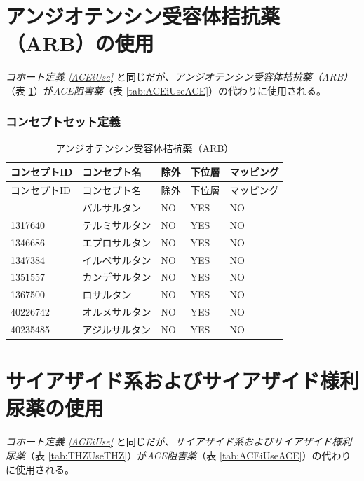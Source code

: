 \documentclass[
  11pt]{book}
\theoremstyle{definition}
\theoremstyle{definition}
\theoremstyle{definition}
\theoremstyle{definition}
\theoremstyle{remark}
\begin{document}
\section{アンジオテンシン受容体拮抗薬（ARB）の使用}\label{ARBUse}

\emph{コホート定義 \ref{ACEiUse}} と同じだが、\emph{アンジオテンシン受容体拮抗薬（ARB）}（表 \ref{tab:ARBUseARBs}）が\emph{ACE阻害薬}（表 \ref{tab:ACEiUseACE}）の代わりに使用される。

\subsubsection*{コンセプトセット定義}\label{ux30b3ux30f3ux30bbux30d7ux30c8ux30bbux30c3ux30c8ux5b9aux7fa9-5}

\begin{longtable}[]{@{}lllll@{}}
\caption{\label{tab:ARBUseARBs} アンジオテンシン受容体拮抗薬（ARB）}\tabularnewline
\toprule\noalign{}
コンセプトID & コンセプト名 & 除外 & 下位層 & マッピング \\
\midrule\noalign{}
\endfirsthead
\toprule\noalign{}
コンセプトID & コンセプト名 & 除外 & 下位層 & マッピング \\
\midrule\noalign{}
\endhead
\bottomrule\noalign{}
\endlastfoot
1308842 & バルサルタン & NO & YES & NO \\
1317640 & テルミサルタン & NO & YES & NO \\
1346686 & エプロサルタン & NO & YES & NO \\
1347384 & イルベサルタン & NO & YES & NO \\
1351557 & カンデサルタン & NO & YES & NO \\
1367500 & ロサルタン & NO & YES & NO \\
40226742 & オルメサルタン & NO & YES & NO \\
40235485 & アジルサルタン & NO & YES & NO \\
\end{longtable}

\section{サイアザイド系およびサイアザイド様利尿薬の使用}\label{THZUse}

\emph{コホート定義 \ref{ACEiUse}} と同じだが、\emph{サイアザイド系およびサイアザイド様利尿薬}（表 \ref{tab:THZUseTHZ}）が\emph{ACE阻害薬}（表 \ref{tab:ACEiUseACE}）の代わりに使用される。
\end{document}
